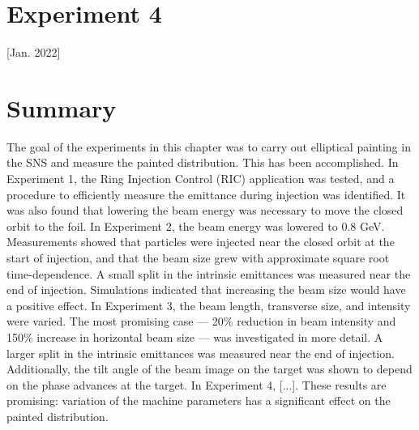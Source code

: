 \section{Experiment 4}

[Jan. 2022]


\section{Summary}

The goal of the experiments in this chapter was to carry out elliptical painting in the SNS and measure the painted distribution. This has been accomplished. In Experiment 1, the Ring Injection Control (RIC) application was tested, and a procedure to efficiently measure the emittance during injection was identified. It was also found that lowering the beam energy was necessary to move the closed orbit to the foil. In Experiment 2, the beam energy was lowered to 0.8 GeV. Measurements showed that particles were injected near the closed orbit at the start of injection, and that the beam size grew with approximate square root time-dependence. A small split in the intrinsic emittances was measured near the end of injection. Simulations indicated that increasing the beam size would have a positive effect. In Experiment 3, the beam length, transverse size, and intensity were varied. The most promising case — 20\% reduction in beam intensity and 150\% increase in horizontal beam size — was investigated in more detail. A larger split in the intrinsic emittances was measured near the end of injection. Additionally, the tilt angle of the beam image on the target was shown to depend on the phase advances at the target. In Experiment 4, [...]. These results are promising: variation of the machine parameters has a significant effect on the painted distribution.